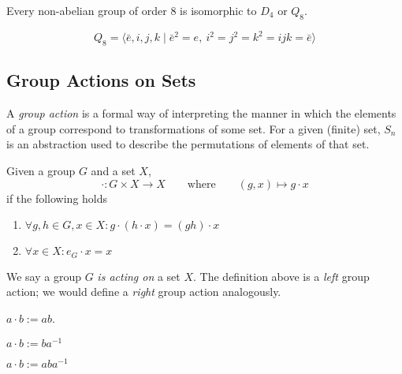 \begin{proposition}
   Every non-abelian group of order 8 is isomorphic to \(D_4\) or \(Q_8\).
\end{proposition}

\begin{definition}
   \[Q_8 = \langle \bar{e},i,j,k \mid \bar{e}^{2} = e,~ i^2 = j^2 = k^2 = ijk = \bar{e}\rangle\]
\end{definition}

\subsection{Group Actions on Sets}
A \emph{group action} is a formal way of interpreting the manner in which the elements of a group correspond to transformations of some set.
For a given (finite) set, \(S_n\) is an abstraction used to describe the permutations of elements of that set.

\begin{definition}
   Given a group \(G\) and a set \(X\),
   \[\cdot: G \times X \to X \qquad\text{where}\qquad (g, x) \mapsto g \cdot x\]
   if the following holds
   \begin{enumerate}[label=\roman*, align=Center]
      \item \(\forall g, h \in G, x \in X: g \cdot (h \cdot x) = (gh) \cdot x\)
      \item \(\forall x \in X: e_G \cdot x = x\)
   \end{enumerate}
\end{definition}
\begin{remark}
   We say a group \(G\) \emph{is acting on} a set \(X\).
   The definition above is a \emph{left} group action; we would define a \emph{right} group action analogously.
\end{remark}
\begin{example}
   \(a \cdot b := ab\).
\end{example}
\begin{example}
   \(a \cdot b := ba^{-1}\)
\end{example}
\begin{example}[Conjugation]
   \(a \cdot b := aba^{-1}\)
\end{example}

